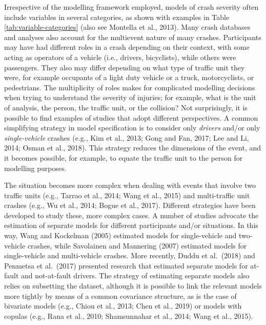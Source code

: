 \documentclass[]{elsarticle} %
\begin{document}
Irrespective of the modelling framework employed, models of crash
severity often include variables in several categories, as shown with
examples in Table \ref{tab:variable-categories} (also see Montella et
al., 2013). Many crash databases and analyses also account for the
multievent nature of many crashes. Participants may have had different
roles in a crash depending on their context, with some acting as
operators of a vehicle (i.e., drivers, bicyclists), while others were
passengers. They also may differ depending on what type of traffic unit
they were, for example occupants of a light duty vehicle or a truck,
motorcyclists, or pedestrians. The multiplicity of roles makes for
complicated modelling decisions when trying to understand the severity
of injuries; for example, what is the unit of analysis, the person, the
traffic unit, or the collision? Not surprisingly, it is possible to find
examples of studies that adopt different perspectives. A common
simplifying strategy in model specification is to consider only
\emph{drivers} and/or only \emph{single-vehicle} crashes (e.g., Kim et
al., 2013; Gong and Fan, 2017; Lee and Li, 2014; Osman et al., 2018).
This strategy reduces the dimensions of the event, and it becomes
possible, for example, to equate the traffic unit to the person for
modelling purposes.

The situation becomes more complex when dealing with events that involve
two traffic units (e.g., Tarrao et al., 2014; Wang et al., 2015) and
multi-traffic unit crashes (e.g., Wu et al., 2014; Bogue et al., 2017).
Different strategies have been developed to study these, more complex
cases. A number of studies advocate the estimation of separate models
for different participants and/or situations. In this way, Wang and
Kockelman (2005) estimated models for single-vehicle and two-vehicle
crashes, while Savolainen and Mannering (2007) estimated models for
single-vehicle and multi-vehicle crashes. More recently, Duddu et
al.~(2018) and Penmetsa et al.~(2017) presented research that estimated
separate models for at-fault and not-at-fault drivers. The strategy of
estimating separate models also relies on subsetting the dataset,
although it is possible to link the relevant models more tightly by
means of a common covariance structure, as is the case of bivariate
models (e.g., Chiou et al., 2013; Chen et al., 2019) or models with
copulas (e.g., Rana et al., 2010; Shamsunnahar et al., 2014; Wang et
al., 2015).
\end{document}
